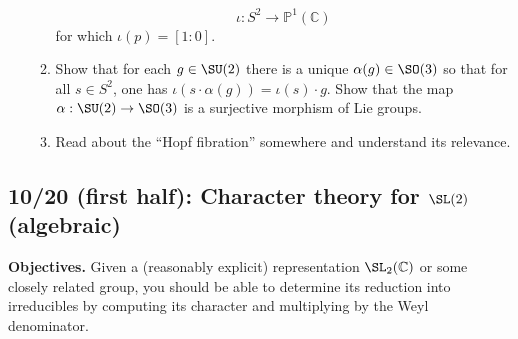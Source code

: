 \documentclass[reqno]{amsart} 
\begin{document}
\begin{homework}
\begin{enumerate}
\begin{enumerate}
      \begin{equation*}
        \iota : S^2 \rightarrow \mathbb{P}^1(\mathbb{C})
      \end{equation*}
      for which $\iota(p) = [1:0]$.
    \item Show that for each $g \in \SU(2)$ there is a unique $\alpha(g) \in \SO(3)$ so that for all $s \in S^2$, one has $\iota(s \cdot \alpha(g)) = \iota(s) \cdot g$.  Show that the map $\alpha : \SU(2) \rightarrow \SO(3)$ is a surjective morphism of Lie groups.
    \item Read about the ``Hopf fibration'' somewhere and understand its relevance.
    \end{enumerate}
  \end{enumerate}
\end{homework}

\newpage
\subsection{10/20 (first half): Character theory for \texorpdfstring{$\SL(2)$}{SL2} (algebraic)}
\label{sec:org7c4df3a}
\textbf{Objectives.} Given a (reasonably explicit) representation \(\SL_2(\mathbb{C})\) or some closely related group, you should be able to determine its reduction into irreducibles by computing its character and multiplying by the Weyl denominator.
\end{document}
